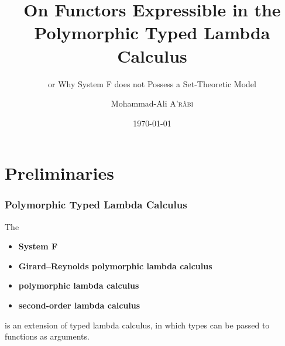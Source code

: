 \documentclass[10pt, compress]{beamer}
\title{On Functors Expressible in the Polymorphic Typed Lambda Calculus}
\subtitle{or Why System F does not Possess a Set-Theoretic Model}
\date{\today}
\author{Mohammad-Ali \textsc{A'r\^abi}}
\institute{Albert-Ludwigs-Universit\"at Freiburg}
\begin{document}
\maketitle

\section{Preliminaries}

\begin{frame}[fragile]
  \frametitle{Polymorphic Typed Lambda Calculus}
  
  The
  \begin{itemize}
      \item \textbf{System F}
      \item \textbf{Girard--Reynolds polymorphic lambda calculus}
      \item \textbf{polymorphic lambda calculus}
      \item \textbf{second-order lambda calculus}
  \end{itemize}
  is an extension of typed lambda calculus, in which types can be passed to functions as arguments.
\end{frame}

\end{document}
